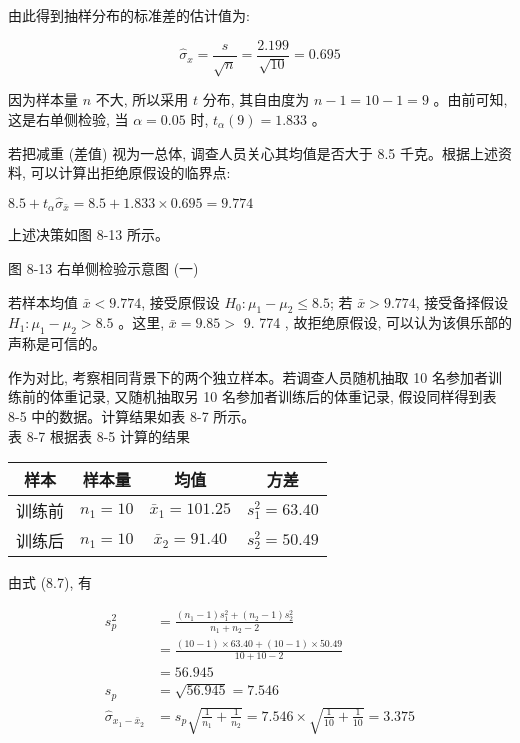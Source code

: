 \documentclass[10pt]{article}
\begin{document}
\begin{CJK*}{UTF8}{bsmi}
由此得到抽样分布的标准差的估计值为:

$$
\hat{\sigma}_{x}=\frac{s}{\sqrt{n}}=\frac{2.199}{\sqrt{10}}=0.695
$$

因为样本量 $n$ 不大, 所以采用 $t$ 分布, 其自由度为 $n-1=10-1=9$ 。由前可知, 这是右单侧检验, 当 $\alpha=0.05$ 时, $t_{\alpha}(9)=1.833$ 。

若把减重 (差值) 视为一总体, 调查人员关心其均值是否大于 8.5 千克。根据上述资料, 可以计算出拒绝原假设的临界点:

$8.5+t_{\alpha} \hat{\sigma}_{\bar{x}}=8.5+1.833 \times 0.695=9.774$

上述决策如图 8-13 所示。

\begin{center}
\end{center}

图 8-13 右单侧检验示意图 (一)

若样本均值 $\bar{x}<9.774$, 接受原假设 $H_{0}: \mu_{1}-\mu_{2} \leqslant 8.5$; 若 $\bar{x}>9.774$, 接受备择假设 $H_{1}: \mu_{1}-\mu_{2}>8.5$ 。这里, $\bar{x}=9.85>$ 9. 774 , 故拒绝原假设, 可以认为该俱乐部的声称是可信的。

作为对比, 考察相同背景下的两个独立样本。若调查人员随机抽取 10 名参加者训练前的体重记录, 又随机抽取另 10 名参加者训练后的体重记录, 假设同样得到表 8-5 中的数据。计算结果如表 8-7 所示。\\
表 8-7 根据表 8-5 计算的结果

\begin{center}
\begin{tabular}{cccc}
\hline
样本 & 样本量 & 均值 & 方差 \\
\hline
训练前 & $n_{1}=10$ & $\bar{x}_{1}=101.25$ & $s_{1}^{2}=63.40$ \\
训练后 & $n_{1}=10$ & $\bar{x}_{2}=91.40$ & $s_{2}^{2}=50.49$ \\
\hline
\end{tabular}
\end{center}

由式 (8.7), 有

$$
\begin{aligned}
s_{p}^{2} & =\frac{\left(n_{1}-1\right) s_{1}^{2}+\left(n_{2}-1\right) s_{2}^{2}}{n_{1}+n_{2}-2} \\
& =\frac{(10-1) \times 63.40+(10-1) \times 50.49}{10+10-2} \\
& =56.945 \\
s_{p} & =\sqrt{56.945}=7.546 \\
\hat{\sigma}_{x_{1}-\bar{x}_{2}} & =s_{p} \sqrt{\frac{1}{n_{1}}+\frac{1}{n_{2}}}=7.546 \times \sqrt{\frac{1}{10}+\frac{1}{10}}=3.375
\end{aligned}
$$


\end{CJK*}
\end{document}
